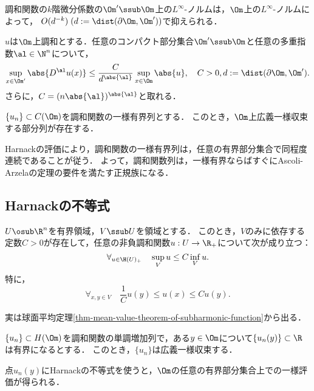 \documentclass[uplatex,dvipdfmx]{jsreport}
\begin{document}
\begin{tcolorbox}[colframe=ForestGreen, colback=ForestGreen!10!white,breakable,colbacktitle=ForestGreen!40!white,coltitle=black,fonttitle=\bfseries\sffamily,
title=]
    調和関数の$k$階微分係数の$\Om'\ssub\Om$上の$L^\infty$-ノルムは，$\Om$上の$L^\infty$-ノルムによって，
    $O(d^{-k})\;(d:=\dist(\partial\Om,\Om'))$で抑えられる．
\end{tcolorbox}

\begin{theorem}[Harnackの評価]\label{thm-Harnack-evaluation-of-derivative}
    $u$は$\Om$上調和とする．任意のコンパクト部分集合$\Om'\ssub\Om$と任意の多重指数$\al\in\N^n$について，
    \[\sup_{x\in\Om'}\abs{D^\al u(x)}\le\frac{C}{d^{\abs{\al}}}\sup_{x\in\Om}\abs{u},\quad  C>0,d:=\dist(\partial\Om,\Om').\]
    さらに，$C=(n\abs{\al})^{\abs{\al}}$と取れる．
\end{theorem}

\begin{corollary}
    $\{u_n\}\subset C(\Om)$を調和関数の一様有界列とする．
    このとき，$\Om$上広義一様収束する部分列が存在する．
\end{corollary}
\begin{Proof}
    Harnackの評価により，調和関数の一様有界列は，任意の有界部分集合で同程度連続であることが従う．
    よって，調和関数列は，一様有界ならばすぐにAscoli-Arzelaの定理の要件を満たす正規族になる．
\end{Proof}

\subsection{Harnackの不等式}

\begin{theorem}
    $U\osub\R^n$を有界領域，$V\ssub U$を領域とする．
    このとき，$V$のみに依存する定数$C>0$が存在して，任意の非負調和関数$u:U\to\R_+$について次が成り立つ：
    \[\forall_{u\in\H(U)_+}\quad\sup_{V}u\le C\inf_Vu.\]
    特に，
    \[\forall_{x,y\in V}\quad\frac{1}{C}u(y)\le u(x)\le Cu(y).\]
\end{theorem}
\begin{Proof}
    実は球面平均定理\ref{thm-mean-value-theorem-of-subharmonic-function}から出る．

\end{Proof}

\begin{corollary}[Harnackの収束定理]
    $\{u_n\}\subset H(\Om)$を調和関数の単調増加列で，ある$y\in\Om$について$\{u_n(y)\}\subset\R$は有界になるとする．
    このとき，$\{u_n\}$は広義一様収束する．
\end{corollary}
\begin{Proof}
    点$u_n(y)$にHarnackの不等式を使うと，$\Om$の任意の有界部分集合上での一様評価が得られる．
\end{Proof}
\end{document}
